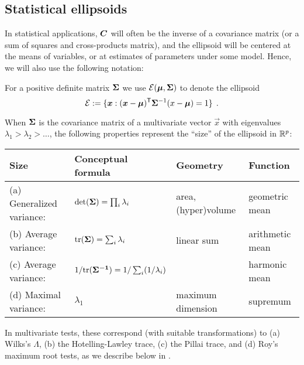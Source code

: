 \subsection{Statistical ellipsoids}

In statistical applications, $\bm{C}$ will often be the inverse of a covariance
matrix (or a sum of squares and cross-products matrix), and the ellipsoid will
be centered at the means of variables, or at estimates of parameters under some model.
Hence, we will also use the following notation:

For a positive definite matrix
$\bm{\Sigma}$ we use $\mathcal{E}(\bm{\mu},\bm{\Sigma})$ to denote the ellipsoid
\begin{equation}\label{eq:ellipsoid3}
\mathcal{E} := \{ \bm{x} : (\bm{x}-\bm{\mu})^\mathsf{T} \bm{\Sigma}^{-1} (x-\bm{\mu}) = 1 \} \:\: .
 \end{equation}

When $\bm{\Sigma}$ is the covariance matrix of a multivariate vector $\vec{x}$ with eigenvalues
$\lambda_1 > \lambda_2 > \dots$,
the following
properties represent the ``size'' of the ellipsoid in $\mathbb{R}^{p}$:

\begin{tabular}{llll}
    Size                   &  Conceptual formula                    & Geometry       & Function \\
\hline
(a) Generalized variance:  & $\mathrm{det} (\bm{\Sigma}) = \prod_i \lambda_i$ & area, (hyper)volume & geometric mean\\  
(b) Average variance:        & $\mathrm{tr} (\bm{\bm{\Sigma}}) = \sum_i \lambda_i $ & linear sum & arithmetic mean\\     %
(c) Average variance:        & $1/ \mathrm{tr} (\bm{\bm{\Sigma}^{-1}}) = 1/\sum_i (1/\lambda_i) $ &  & harmonic mean\\
(d) Maximal variance:      & $\lambda_1$ & maximum dimension & supremum
 \end{tabular}
\medskip

\noindent In multivariate tests, these correspond (with suitable transformations) to (a) Wilks's $\Lambda$,
(b) the Hotelling-Lawley  trace, (c) the Pillai trace, and (d) Roy's maximum root tests, as we describe
below in .

